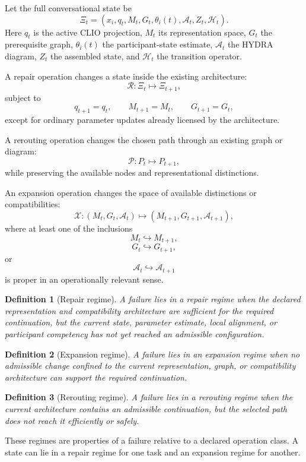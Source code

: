 \documentclass[11pt]{article}
\newtheorem{definition}{Definition}[section]
\theoremstyle{definition}
\newcommand{\A}{\mathcal{A}}
\newcommand{\Hh}{\mathcal{H}}
\begin{document}
Let the full conversational state be
\[
\Xi_t
=
\left(
x_i,
q_t,
M_t,
G_t,
\theta_i(t),
\A_t,
Z_t,
\Hh_t
\right).
\]
Here \(q_t\) is the active CLIO projection, \(M_t\) its representation space, \(G_t\) the prerequisite graph, \(\theta_i(t)\) the participant-state estimate, \(\A_t\) the HYDRA diagram, \(Z_t\) the assembled state, and \(\Hh_t\) the transition operator.

A repair operation changes a state inside the existing architecture:
\[
\mathcal R:
\Xi_t\mapsto\Xi_{t+1},
\]
subject to
\[
q_{t+1}=q_t,
\qquad
M_{t+1}=M_t,
\qquad
G_{t+1}=G_t,
\]
except for ordinary parameter updates already licensed by the architecture.

A rerouting operation changes the chosen path through an existing graph or diagram:
\[
\mathcal P:
P_t\mapsto P_{t+1},
\]
while preserving the available nodes and representational distinctions.

An expansion operation changes the space of available distinctions or compatibilities:
\[
\mathcal X:
(M_t,G_t,\A_t)
\mapsto
(M_{t+1},G_{t+1},\A_{t+1}),
\]
where at least one of the inclusions
\[
M_t\hookrightarrow M_{t+1},
\]
\[
G_t\hookrightarrow G_{t+1},
\]
or
\[
\A_t\hookrightarrow\A_{t+1}
\]
is proper in an operationally relevant sense.

\begin{definition}[Repair regime]
A failure lies in a repair regime when the declared representation and compatibility architecture are sufficient for the required continuation, but the current state, parameter estimate, local alignment, or participant competency has not yet reached an admissible configuration.
\end{definition}

\begin{definition}[Expansion regime]
A failure lies in an expansion regime when no admissible change confined to the current representation, graph, or compatibility architecture can support the required continuation.
\end{definition}

\begin{definition}[Rerouting regime]
A failure lies in a rerouting regime when the current architecture contains an admissible continuation, but the selected path does not reach it efficiently or safely.
\end{definition}

These regimes are properties of a failure relative to a declared operation class. A state can lie in a repair regime for one task and an expansion regime for another.
\end{document}
